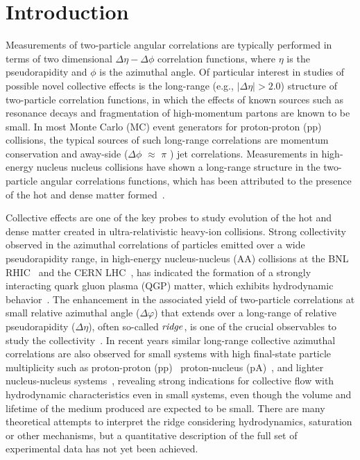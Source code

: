 
\section{Introduction}

Measurements of two-particle angular correlations are typically performed in terms of two dimensional $\Delta\eta-\Delta\phi$ correlation functions, where $\eta$ is the pseudorapidity and $\phi$ is the azimuthal angle. Of particular interest in studies of possible novel  collective effects is the long-range (e.g., $|\Delta\eta| > 2.0$) structure of two-particle correlation functions, in which the effects of known sources such as resonance decays and fragmentation of high-momentum partons are known to be small. In most Monte Carlo (MC) event generators for proton-proton (pp) collisions, the typical sources of such long-range correlations are momentum conservation and away-side ($\Delta\phi$ $\approx$ $\pi$ ) jet correlations. Measurements in high-energy nucleus nucleus collisions have shown a long-range structure in the two-particle angular correlations functions, which has been attributed to the presence of the hot and dense matter formed~\cite{Romatschke:2007mq,Adams:2005dq,Adcox:2004mh,Arsene:2004fa,Back:2004je}. 

Collective effects are one of the key probes to study evolution of the hot and dense matter created in ultra-relativistic heavy-ion collisions. Strong collectivity observed in the azimuthal correlations of particles emitted over a wide pseudorapidity range, in high-energy nucleus-nucleus (AA) collisions at the BNL RHIC~\cite{Alver:2006wh} and the CERN LHC~\cite{AAbelev:2014pua,ATLAS:2011ah}, has indicated the formation of a strongly interacting quark gluon plasma (QGP) matter, which exhibits hydrodynamic behavior~\cite{}. 
The enhancement in the associated yield of two-particle correlations at small relative azimuthal angle ($\Delta\varphi$) that extends over a long-range of relative pseudorapidity ($\Delta\eta$), often so-called $\it{ridge}$,  is one of the crucial observables to study the collectivity~\cite{Chatrchyan:2012wg, Adam:2016izf}.
In recent years similar long-range collective azimuthal correlations are also observed for small systems with high final-state particle multiplicity such as proton-proton (pp)~\cite{Khachatryan:2015lva, Khachatryan:2016txc, Acharya:2019vdf} proton-nucleus (pA)~\cite{}, and lighter nucleus-nucleus systems~\cite{phenixnature}, revealing strong indications for collective flow with hydrodynamic characteristics even in small systems, even though the volume and lifetime of the medium produced are expected to be small. 
There are many theoretical attempts\cite{Mantysaari:2017cni, Zhao:2017rgg, Welsh:2016siu, Greif:2017bnr} to interpret the ridge considering hydrodynamics, saturation or other mechanisms, but a quantitative description of the full set of experimental data has not yet been achieved.





